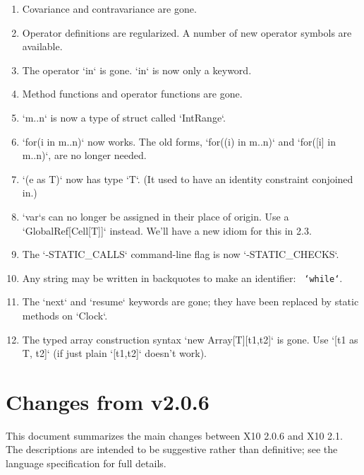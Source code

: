 \begin{enumerate}

\item Covariance and contravariance are gone.

\item Operator definitions are regularized.  A number of new operator symbols
      are available.

\item The operator \xcd`in` is gone.  \xcd`in` is now only a keyword.

\item Method functions and operator functions are gone.

\item \xcd`m..n` is now a type of struct called \xcd`IntRange`.  

\item \xcd`for(i in m..n)` now works.  The old forms, \xcd`for((i) in m..n)`
      and \xcd`for([i] in m..n)`, are no longer needed.

\item \xcd`(e as T)` now has type \xcd`T`.  (It used to have an identity
      constraint conjoined in.)

\item \xcd`var`s can no longer be assigned in their place of origin.  Use a
      \xcd`GlobalRef[Cell[T]]` instead.  We'll have a new idiom for this in 2.3.

\item The \xcd`-STATIC_CALLS` command-line flag is now \xcd`-STATIC_CHECKS`.

\item Any string may be written in backquotes to make an identifier: {\tt
      `while`}.

\item The \xcd`next` and \xcd`resume` keywords are gone; they have been
      replaced by static methods on \xcd`Clock`.

\item The typed array construction syntax \xcd`new Array[T][t1,t2]` is gone.
      Use \xcd`[t1 as T, t2]` (if just plain \xcd`[t1,t2]` doesn't work).

\end{enumerate}


\section{Changes from \Xten{} v2.0.6}

This document summarizes the main changes between X10 2.0.6 and X10 2.1.  The
descriptions are intended to be suggestive rather than definitive; see the
language specification for full details.

